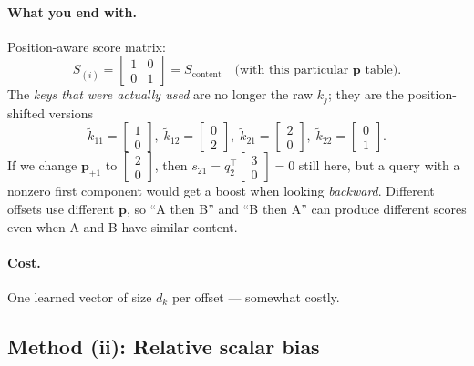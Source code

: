 \documentclass[11pt]{article}
\begin{document}
\paragraph{What you end with.}
Position-aware score matrix:
\[
  S_{(i)}
  =
  \begin{bmatrix}1&0\\0&1\end{bmatrix}
  =
  S_{\text{content}}
  \quad\text{(with this particular \(\mathbf{p}\) table)}.
\]
The \emph{keys that were actually used} are no longer the raw \(k_j\); they
are the position-shifted versions
\[
  \tilde{k}_{11}=\begin{bmatrix}1\\0\end{bmatrix},\;
  \tilde{k}_{12}=\begin{bmatrix}0\\2\end{bmatrix},\;
  \tilde{k}_{21}=\begin{bmatrix}2\\0\end{bmatrix},\;
  \tilde{k}_{22}=\begin{bmatrix}0\\1\end{bmatrix}.
\]
If we change \(\mathbf{p}_{+1}\) to \(\begin{bmatrix}2\\0\end{bmatrix}\),
then \(s_{21}=q_2^\top\begin{bmatrix}3\\0\end{bmatrix}=0\) still here, but
a query with a nonzero first component would get a boost when looking
\emph{backward}. Different offsets use different \(\mathbf{p}\), so
``A then B'' and ``B then A'' can produce different scores even when A and
B have similar content.

\paragraph{Cost.}
One learned vector of size \(d_k\) per offset --- somewhat costly.

\subsection{Method (ii): Relative scalar bias}
\end{document}
